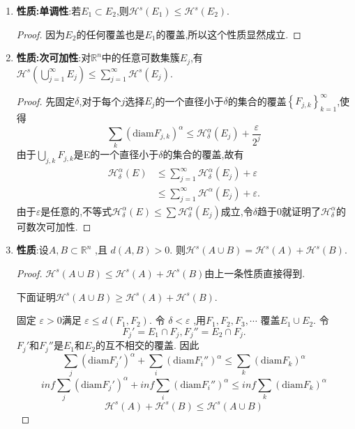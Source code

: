 \documentclass[hyperref,a4paper,UTF8]{ctexart}
\begin{document}
\begin{enumerate}

  \item \textbf{性质:单调性}:若$E_1 \subset E_2$,则$\mathcal{H}^s(E_1) \leqslant \mathcal{H}^s(E_2)$.

  \begin{proof}
    因为$E_2$的任何覆盖也是$E_1$的覆盖,所以这个性质显然成立.
  \end{proof}

  \item \textbf{性质:次可加性}:对$\mathbb{R}^n$中的任意可数集簇${E_j}$,有$\mathcal{H}^s\left(\bigcup\limits_{j=1}^{\infty} E_j\right) \leqslant \sum_{j=1}^{\infty} \mathcal{H}^s\left(E_j\right)$.
  \begin{proof}
    先固定$\delta$,对于每个$j$选择$E_j$的一个直径小于$\delta$的集合的覆盖$\left \{  F_{j,k} \right \}^{\infty}_{k=1}$,使得
    $$\sum_k(\mathrm{diam}F_{j,k})^{\alpha}\leqslant \mathcal{H}_\delta^\alpha(E_j)+\frac{\varepsilon}{2^j} $$
    由于$\bigcup\limits_{j,k} F_{j,k}$是E的一个直径小于$\delta$的集合的覆盖,故有
    \begin{align*}
      \mathcal{H}_\delta^\alpha(E) & \leqslant \sum_{j=1}^{\infty} \mathcal{H}_\delta^\alpha(E_j)+\varepsilon \\
      & \leqslant \sum_{j=1}^{\infty} \mathcal{H}^\alpha(E_j)+\varepsilon. 
    \end{align*}
    由于$\varepsilon$是任意的,不等式$\mathcal{H}_\delta^\alpha(E) \leqslant \sum \mathcal{H}_\delta^\alpha(E_j)$成立,令$\delta$趋于0就证明了$\mathcal{H}_\delta^\alpha$的可数次可加性.
  \end{proof}
  
  \item \textbf{性质}:设$A,B \subset \mathbb{R}^n$ ,且 $d(A, B)>0$.
   则$\mathcal{H}^{s}(A \cup B)=\mathcal{H}^{s}(A)+\mathcal{H}^{s}(B)$.

  \begin{proof}
    $\mathcal{H}^{s}(A \cup B)\leqslant \mathcal{H}^{s}(A)+\mathcal{H}^{s}(B)$由上一条性质直接得到.

    下面证明$\mathcal{H}^{s}(A \cup B)\geqslant \mathcal{H}^{s}(A)+\mathcal{H}^{s}(B)$. 

    固定 $\varepsilon > 0 $满足 $\varepsilon \le d(F_1, F_2)$. 令 $\delta < \varepsilon$ ,用$F_1, F_2, F_3, \cdots$ 覆盖$E_1\cup E_2$. 
    令
    \[
      F_j' = E_1 \cap F_j, F_j{''} = E_2 \cap F_j. 
    \]
    ${F_j'}$和${F_j{''}}$是$E_1$和$E_2$的互不相交的覆盖. 
    因此
    \[
      \sum_j (\mathrm{diam} F_j')^{\alpha}+\sum_i (\mathrm{diam} F_i{''})^{\alpha} \leqslant \sum_k (\mathrm{diam} F_k)^{\alpha}
    \]
    \[
      inf \sum_j (\mathrm{diam} F_j')^{\alpha}+inf\sum_i (\mathrm{diam} F_i{''})^{\alpha} \leqslant inf\sum_k (\mathrm{diam} F_k)^{\alpha}
    \]
    \[
        \mathcal{H}^{s}(A)+\mathcal{H}^{s}(B) \leqslant \mathcal{H}^{s}(A \cup B)
    \]
  \end{proof}
\end{enumerate}
\end{document}
